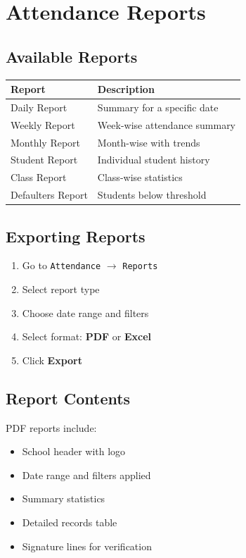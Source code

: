 \documentclass[12pt,a4paper]{report}
\begin{document}
\chapter{Attendance Reports}

\section{Available Reports}

\begin{longtable}{@{}p{4cm}p{9cm}@{}}
\toprule
\textbf{Report} & \textbf{Description} \\
\midrule
\endhead
Daily Report & Summary for a specific date \\
Weekly Report & Week-wise attendance summary \\
Monthly Report & Month-wise with trends \\
Student Report & Individual student history \\
Class Report & Class-wise statistics \\
Defaulters Report & Students below threshold \\
\bottomrule
\end{longtable}

\section{Exporting Reports}

\begin{enumerate}[leftmargin=*]
    \item Go to \texttt{Attendance} $\rightarrow$ \texttt{Reports}
    \item Select report type
    \item Choose date range and filters
    \item Select format: \textbf{PDF} or \textbf{Excel}
    \item Click \textbf{Export}
\end{enumerate}

\section{Report Contents}

PDF reports include:
\begin{itemize}[leftmargin=*]
    \item School header with logo
    \item Date range and filters applied
    \item Summary statistics
    \item Detailed records table
    \item Signature lines for verification
\end{itemize}
\end{document}
